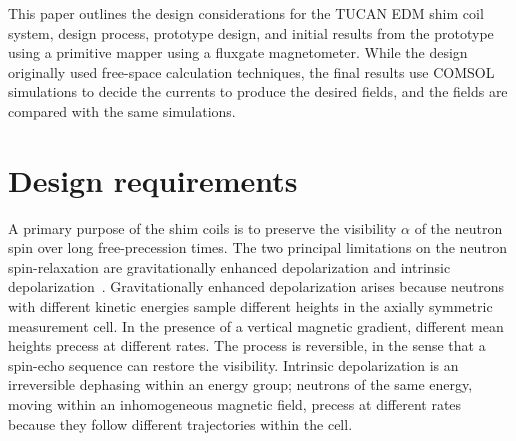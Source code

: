 \documentclass[preprint,12pt]{elsarticle}
\begin{document}
This paper outlines the design considerations for the TUCAN EDM shim
coil system, design process, prototype design, and initial results
from the prototype using a primitive mapper using a fluxgate
magnetometer.  While the design originally used free-space calculation
techniques, the final results use COMSOL simulations to decide the
currents to produce the desired fields, and the fields are compared
with the same simulations.


\section{Design requirements}\label{sec2}

A primary purpose of the shim coils is to preserve the visibility
$\alpha$ of the neutron spin over long free-precession times.  The two
principal limitations on the neutron spin-relaxation are
gravitationally enhanced depolarization and intrinsic
depolarization~\cite{bib:Abel2019}. Gravitationally enhanced
depolarization arises because neutrons with different kinetic energies
sample different heights in the axially symmetric measurement cell.
In the presence of a vertical magnetic gradient, different mean
heights precess at different rates. The process is reversible, in the
sense that a spin-echo sequence can restore the visibility.  Intrinsic
depolarization is an irreversible dephasing within an energy group;
neutrons of the same energy, moving within an inhomogeneous magnetic
field, precess at different rates because they follow different
trajectories within the cell.
\end{document}
